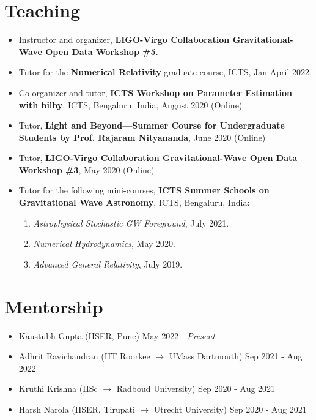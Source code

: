 \documentclass[11pt, margin, centered, letterpaper]{res}
\begin{document}
\begin{resume}
\begin{itemize}[leftmargin=*]
\end{itemize}

\section{Teaching}
\begin{itemize}[leftmargin=*]
	\item Instructor and organizer, \textbf{LIGO-Virgo Collaboration Gravitational-Wave Open Data Workshop \#5}.
	\item Tutor for the \textbf{Numerical Relativity} graduate course, ICTS, Jan-April 2022.
	\item Co-organizer and tutor, \textbf{ICTS Workshop on Parameter Estimation with bilby}, ICTS, Bengaluru, India, August 2020 (Online)
	\item Tutor, \textbf{Light and Beyond---Summer Course for Undergraduate Students by Prof. Rajaram Nityananda}, June 2020 (Online)
	\item Tutor, \textbf{LIGO-Virgo Collaboration Gravitational-Wave Open Data Workshop \#3}, May 2020 (Online)
	\item Tutor for the following mini-courses, \textbf{ICTS Summer Schools on Gravitational Wave Astronomy}, ICTS, Bengaluru, India:
	\begin{enumerate}
		\item \textit{Astrophysical Stochastic GW Foreground}, July 2021.
		\item \textit{Numerical Hydrodynamics}, May 2020.
		\item \textit{Advanced General Relativity}, July 2019.
	\end{enumerate}
\end{itemize}


\section{Mentorship}
\begin{itemize}[leftmargin=*]
    \item Kaustubh Gupta (IISER, Pune) \hfill May 2022 - \textit{Present}
    \item Adhrit Ravichandran (IIT Roorkee $\rightarrow$ UMass Dartmouth) \hfill Sep 2021 - Aug 2022
	\item Kruthi Krishna (IISc $ \rightarrow $ Radboud University) \hfill Sep 2020 - Aug 2021
	\item Harsh Narola (IISER, Tirupati $ \rightarrow $ Utrecht University) \hfill Sep 2020 - Aug 2021
\end{itemize}


\end{resume}
\end{document}
